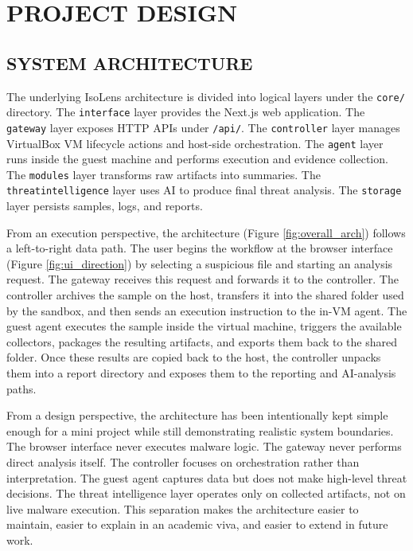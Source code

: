 \documentclass[a4paper,12pt,oneside]{report}
\begin{document}
\chapter{PROJECT DESIGN}
\section{SYSTEM ARCHITECTURE}
The underlying IsoLens architecture is divided into logical layers under the \texttt{core/} directory. The \texttt{interface} layer provides the Next.js web application. The \texttt{gateway} layer exposes HTTP APIs under \texttt{/api/}. The \texttt{controller} layer manages VirtualBox VM lifecycle actions and host-side orchestration. The \texttt{agent} layer runs inside the guest machine and performs execution and evidence collection. The \texttt{modules} layer transforms raw artifacts into summaries. The \texttt{threatintelligence} layer uses AI to produce final threat analysis. The \texttt{storage} layer persists samples, logs, and reports.

\par

\par

From an execution perspective, the architecture (Figure \ref{fig:overall_arch}) follows a left-to-right data path. The user begins the workflow at the browser interface (Figure \ref{fig:ui_direction}) by selecting a suspicious file and starting an analysis request. The gateway receives this request and forwards it to the controller. The controller archives the sample on the host, transfers it into the shared folder used by the sandbox, and then sends an execution instruction to the in-VM agent. The guest agent executes the sample inside the virtual machine, triggers the available collectors, packages the resulting artifacts, and exports them back to the shared folder. Once these results are copied back to the host, the controller unpacks them into a report directory and exposes them to the reporting and AI-analysis paths.

\par

\par

From a design perspective, the architecture has been intentionally kept simple enough for a mini project while still demonstrating realistic system boundaries. The browser interface never executes malware logic. The gateway never performs direct analysis itself. The controller focuses on orchestration rather than interpretation. The guest agent captures data but does not make high-level threat decisions. The threat intelligence layer operates only on collected artifacts, not on live malware execution. This separation makes the architecture easier to maintain, easier to explain in an academic viva, and easier to extend in future work.
\end{document}
